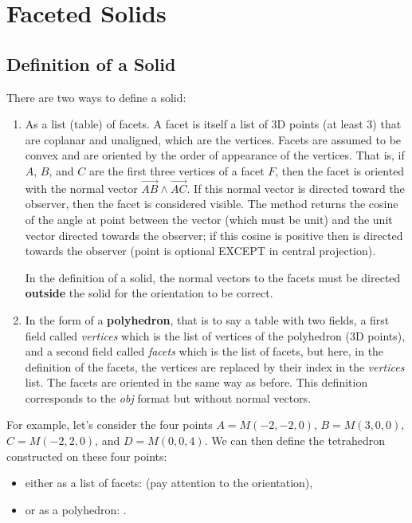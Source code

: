 \section{Faceted Solids}

\subsection{Definition of a Solid}

There are two ways to define a solid:
\begin{enumerate}
    \item As a list (table) of facets. A facet is itself a list of 3D points (at least 3) that are coplanar and unaligned, which are the vertices. Facets are assumed to be convex and are oriented by the order of appearance of the vertices. That is, if $A$, $B$, and $C$ are the first three vertices of a facet $F$, then the facet is oriented with the normal vector $\vec{AB}\wedge\vec{AC}$. If this normal vector is directed toward the observer, then the facet is considered visible. The method  returns the cosine of the angle at point  between the vector  (which must be unit) and the unit vector directed towards the observer; if this cosine is positive then  is directed towards the observer (point  is optional EXCEPT in central projection).


In the definition of a solid, the normal vectors to the facets must be directed \textbf{outside} the solid for the orientation to be correct.

    \item In the form of a \textbf{polyhedron}, that is to say a table with two fields, a first field called \emph{vertices} which is the list of vertices of the polyhedron (3D points), and a second field called \emph{facets} which is the list of facets, but here, in the definition of the facets, the vertices are replaced by their index in the \emph{vertices} list. The facets are oriented in the same way as before. This definition corresponds to the \emph{obj} format but without normal vectors. 
\end{enumerate}

For example, let's consider the four points $A=M(-2,-2,0)$, $B=M(3,0,0)$, $C=M(-2,2,0)$, and $D=M(0,0,4)$. We can then define the tetrahedron constructed on these four points:
\begin{itemize}
    \item either as a list of facets:  (pay attention to the orientation),
    \item or as a polyhedron:
.
\end{itemize}

